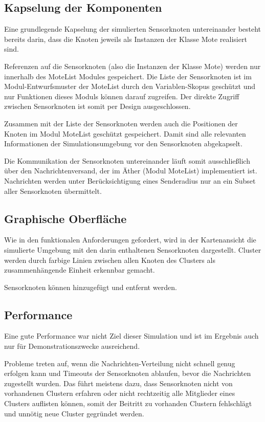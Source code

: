 \subsection{Kapselung der Komponenten}

Eine grundlegende Kapselung der simulierten Sensorknoten untereinander
besteht bereits darin, dass die Knoten jeweils als Instanzen der Klasse
Mote realisiert sind.

Referenzen auf die Sensorknoten (also die Instanzen der Klasse Mote)
werden nur innerhalb des MoteList Modules gespeichert. Die Liste der
Sensorknoten ist im Modul-Entwurfsmuster der MoteList durch den
Variablen-Skopus geschützt und nur Funktionen dieses Moduls können
darauf zugreifen. Der direkte Zugriff zwischen Sensorknoten ist somit
per Design ausgeschlossen.

Zusammen mit der Liste der Sensorknoten werden auch die Positionen der
Knoten im Modul MoteList geschützt gespeichert. Damit sind alle
relevanten Informationen der Simulationsumgebung vor den Sensorknoten
abgekapselt.

Die Kommunikation der Sensorknoten untereinander läuft somit
ausschließlich über den Nachrichtenversand, der im Äther (Modul
MoteList) implementiert ist. Nachrichten werden unter Berücksichtigung
eines Senderadius nur an ein Subset aller Sensorknoten übermittelt.

\subsection{Graphische Oberfläche}

Wie in den funktionalen Anforderungen gefordert, wird in der
Kartenansicht die simulierte Umgebung mit den darin enthaltenen
Sensorknoten dargestellt. Cluster werden durch farbige Linien zwischen
allen Knoten des Clusters als zusammenhängende Einheit erkennbar
gemacht.

Sensorknoten können hinzugefügt und entfernt werden.

\subsection{Performance}

Eine gute Performance war nicht Ziel dieser Simulation und ist im
Ergebnis auch nur für Demonstrationszwecke ausreichend.

Probleme treten auf, wenn die Nachrichten-Verteilung nicht schnell genug
erfolgen kann und Timeouts der Sensorknoten ablaufen, bevor die
Nachrichten zugestellt wurden. Das führt meistens dazu, dass
Sensorknoten nicht von vorhandenen Clustern erfahren oder nicht
rechtzeitig alle Mitglieder eines Clusters auflisten können, somit der
Beitritt zu vorhanden Clustern fehlschlägt und unnötig neue Cluster
gegründet werden.

